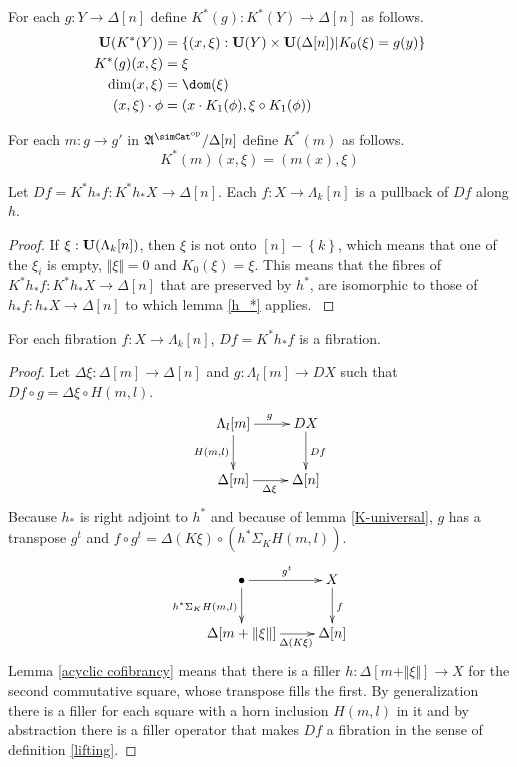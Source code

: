 \documentclass{tac}
\newcommand\set[1]{\left\{#1\right\}}
\newcommand\ri{^*}
\newcommand\dual{^{\mathrm{op}}}
\newcommand\s{^{\simCat\dual}}
\newcommand\of{:}
\newcommand\simplex\Delta
\newcommand\horn\Lambda
\newcommand\norm[1]{\Vert #1 \Vert}
\newcommand\depsum{\Sigma_}
\newcommand\ambient{\mathfrak A}
\begin{document}
\begin{definition} For each $g\of Y\to \simplex[n]$ define $K\ri(g)\of K\ri(Y) \to \simplex [n]$ as follows.
\begin{align*}
\base(K\ri(Y)) &= \set{(x,\xi)\of\base(Y)\times\base(\simplex[n])| K_0(\xi) = g(y) }\\
K\ri(g)(x,\xi) &= \xi\\
\dim(x,\xi) &= \dom(\xi)\\
(x,\xi)\cdot \phi &= (x\cdot K_1(\phi),\xi\circ K_1(\phi))
\end{align*}

For each $m\of g\to g'$ in $\ambient\s/\simplex[n]$ define $K\ri(m)$ as follows.
\[ K\ri(m)(x,\xi) = (m(x),\xi) \]
\end{definition}

\begin{lemma} Let $Df = K\ri h_* f\of K\ri h_*X\to\simplex[n]$. Each $f\of X\to\horn_k[n]$ is a pullback of $Df$ along $h$. \label{f is pullback}\end{lemma}

\begin{proof}
If $\xi\of\base(\horn_k[n])$, then $\xi$ is not onto $[n]-\set k$, which means that one of the $\xi_i$ is empty, $\norm \xi = 0$ and $K_0(\xi)=\xi$.
This means that the fibres of $K\ri h_* f\of K\ri h_*X\to\simplex[n]$ that are preserved by $h\ri$, are isomorphic to those of $h_* f\of h_*X\to\simplex[n]$ to which lemma \ref{h_*} applies.
\label{descent pullback}
\end{proof}

\begin{lemma} For each fibration $f\of X\to\horn_k[n]$, $Df=K\ri h_*f$ is a fibration. \label{descent2} \end{lemma}


\begin{proof} Let $\simplex\xi\of \simplex[m]\to\simplex[n]$ and $g\of \horn_l[m]\to DX$ such that $Df\circ g = \simplex\xi\circ H(m,l)$. 
\[
	\xymatrix{
		\horn_l[m]\ar[r]^g\ar[d]_{H(m,l)} & DX\ar[d]^{Df} \\
		\simplex[m]\ar[r]_{\simplex\xi} & \simplex[n]
	}	
\]
Because $h_*$ is right adjoint to $h\ri$ and because of lemma \ref{K-universal}, $g$ has a transpose $g^t$ and $f\circ g^t = \simplex(K\xi)\circ (h\ri \depsum{K} H(m,l))$.
\[
	\xymatrix{
		\bullet\ar[r]^{g^t}\ar[d]_{h\ri \depsum K H(m,l)} & X\ar[d]^{f} \\
		\simplex[m+\norm\xi]\ar[r]_(.6){\simplex(K\xi)} & \simplex[n]
	}	
\]
Lemma \ref{acyclic cofibrancy} means that there is a filler $h\of \simplex[m+\norm\xi]\to X$ for the second commutative square, whose transpose fills the first.
By generalization there is a filler for each square with a horn inclusion $H(m,l)$ in it and by abstraction there is a filler operator that makes $Df$ a fibration in the sense of definition \ref{lifting}.
\end{proof}
\end{document}
